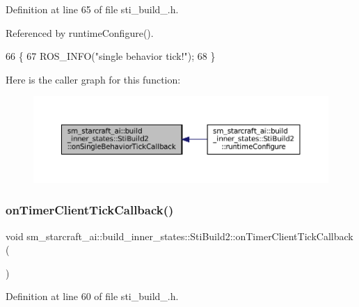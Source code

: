 Definition at line 65 of file sti\+\_\+build\+\_.\+h.



Referenced by runtime\+Configure().


\begin{DoxyCode}
66   \{
67     ROS\_INFO(\textcolor{stringliteral}{"single behavior tick!"});
68   \}
\end{DoxyCode}
Here is the caller graph for this function\+:
\nopagebreak
\begin{figure}[H]
\begin{center}
\leavevmode
\includegraphics[width=350pt]{structsm__starcraft__ai_1_1build__inner__states_1_1StiBuild2_abd5fb7f89d975b5c15810cba5df7acb5_icgraph}
\end{center}
\end{figure}
\mbox{\label{structsm__starcraft__ai_1_1build__inner__states_1_1StiBuild2_af8ce2f1ad0fafe8a93d9545e312c7710}} 
\subsubsection{\texorpdfstring{on\+Timer\+Client\+Tick\+Callback()}{onTimerClientTickCallback()}}
{\footnotesize\ttfamily void sm\+\_\+starcraft\+\_\+ai\+::build\+\_\+inner\+\_\+states\+::\+Sti\+Build2\+::on\+Timer\+Client\+Tick\+Callback (\begin{DoxyParamCaption}{ }\end{DoxyParamCaption})\hspace{0.3cm}{\ttfamily [inline]}}



Definition at line 60 of file sti\+\_\+build\+\_.\+h.



